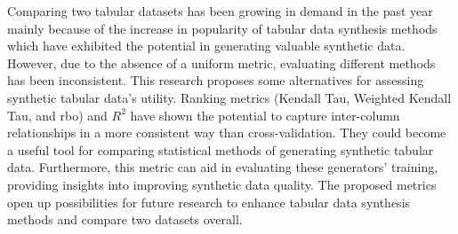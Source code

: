 Comparing two tabular datasets has been growing in demand in the past year mainly because of the increase in popularity of tabular data synthesis methods which have exhibited the potential in generating valuable synthetic data. However, due to the absence of a uniform metric, evaluating different methods has been inconsistent. This research proposes some alternatives for assessing synthetic tabular data's utility. Ranking metrics (Kendall Tau, Weighted Kendall Tau, and \ac{rbo}) and $R^2$ have shown the potential to capture inter-column relationships in a more consistent way than cross-validation. They could become a useful tool for comparing statistical methods of generating synthetic tabular data. Furthermore, this metric can aid in evaluating these generators' training, providing insights into improving synthetic data quality. The proposed metrics open up possibilities for future research to enhance tabular data synthesis methods and compare two datasets overall.